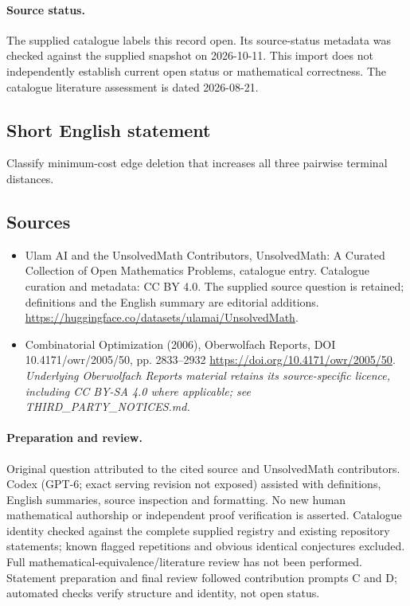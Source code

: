 \documentclass[11pt]{article}
\begin{document}
\paragraph{Source status.}
The supplied catalogue labels this record open. Its source-status metadata was checked against the supplied snapshot on 2026-10-11. This import does not independently establish current open status or mathematical correctness. The catalogue literature assessment is dated 2026-08-21.
\subsection{Short English statement}
Classify minimum-cost edge deletion that increases all three pairwise terminal distances.
\subsection{Sources}
\begin{itemize}
\item[S1] Ulam AI and the UnsolvedMath Contributors, UnsolvedMath: A Curated Collection of Open Mathematics Problems, catalogue entry. Catalogue curation and metadata: CC BY 4.0. The supplied source question is retained; definitions and the English summary are editorial additions.
\url{https://huggingface.co/datasets/ulamai/UnsolvedMath}.
\item[S2] Combinatorial Optimization (2006), Oberwolfach Reports, DOI 10.4171/owr/2005/50, pp. 2833--2932
\url{https://doi.org/10.4171/owr/2005/50}.
\textit{Underlying Oberwolfach Reports material retains its source-specific licence, including CC BY-SA 4.0 where applicable; see THIRD\_PARTY\_NOTICES.md.}
\end{itemize}
\paragraph{Preparation and review.}
Original question attributed to the cited source and UnsolvedMath contributors. Codex (GPT-6; exact serving revision not exposed) assisted with definitions, English summaries, source inspection and formatting. No new human mathematical authorship or independent proof verification is asserted. Catalogue identity checked against the complete supplied registry and existing repository statements; known flagged repetitions and obvious identical conjectures excluded. Full mathematical-equivalence/literature review has not been performed. Statement preparation and final review followed contribution prompts C and D; automated checks verify structure and identity, not open status.
\label{end:statement}
\end{document}

